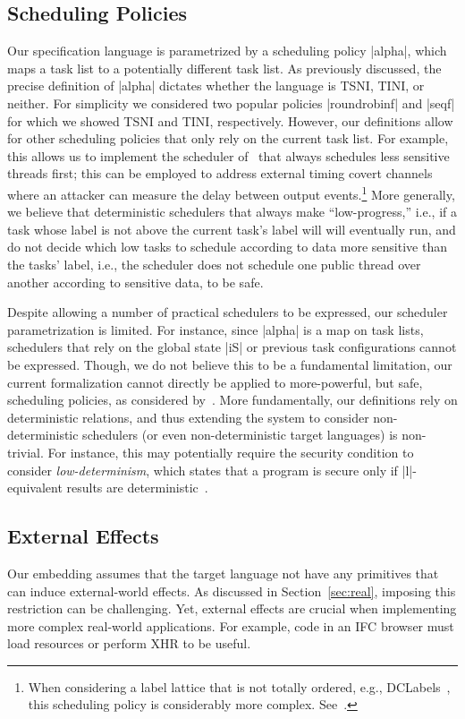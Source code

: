 \subsection{Scheduling Policies}
Our specification language is parametrized by a scheduling policy
|alpha|, which maps a task list to a potentially different task list.
%
As previously discussed, the precise definition of |alpha|
dictates whether the language is TSNI, TINI, or neither.
%
For simplicity we considered two popular policies |roundrobinf| and
|seqf| for which we showed TSNI and TINI, respectively.
%
However, our definitions allow for other scheduling policies that only
rely on the current task list.
%
For example, this allows us to implement the scheduler of~\cite{Kashyap:2011}
that always schedules less sensitive threads first; this can be
employed to address external timing covert channels where an attacker
can measure the delay between output events.\footnote{
  When considering a label lattice that is not totally ordered, e.g.,
  DCLabels~\cite{myers:dlm,dclabels}, this scheduling policy is
  considerably more complex. See~\cite{Kashyap:2011}.
}
%
More generally, we believe that deterministic schedulers that always
make ``low-progress,'' i.e., if a task whose label is not above the
current task's label will will eventually run, and do not decide which
low tasks to schedule according to data more sensitive than the tasks'
label, i.e., the scheduler does not schedule one public thread over
another according to sensitive data, to be safe.
%

Despite allowing a number of practical schedulers to be expressed, our
scheduler parametrization is limited.
%
For instance, since |alpha| is a map on task lists, schedulers that
rely on the global state |iS| or previous task configurations cannot
be expressed.
%
Though, we do not believe this to be a fundamental limitation, our
current formalization cannot directly be applied to more-powerful, but
safe, scheduling policies, as considered by~\cite{russo2006securing}.
%
More fundamentally, our definitions rely on deterministic relations,
and thus extending the system to consider non-deterministic schedulers
(or even non-deterministic target languages) is non-trivial.
%
For instance, this may potentially require the security condition to
consider \emph{low-determinism}, which states that a program is secure
only if |l|-equivalent results are deterministic~\cite{Zdancewic:Myers:CSFW03,
sabelfeld2003language}.

\subsection{External Effects}
\label{sec:extensions:external}
Our embedding assumes that the target language not have any
primitives that can induce external-world effects.
%
As discussed in Section~\ref{sec:real}, imposing this restriction
can be challenging.
%
Yet, external effects are crucial when implementing more complex
real-world applications.
%
For example, code in an IFC browser must load resources or
perform XHR to be useful.

